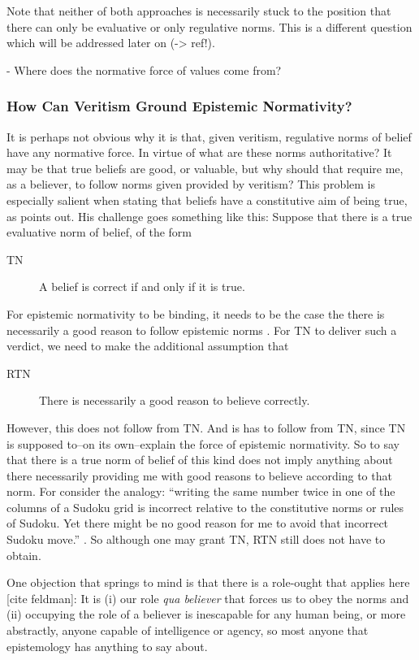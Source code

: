 \documentclass[12pt,numbers=noenddot]{scrartcl}
\begin{document}
Note that neither of both approaches is necessarily stuck to the position that there can only be evaluative or only regulative norms. This is a different question which will be addressed later on (-> ref!).

- Where does the normative force of values come from?
\subsubsection{How Can Veritism Ground Epistemic Normativity?}

It is perhaps not obvious why it is that, given veritism, regulative norms of belief have any normative force. In virtue of what are these norms authoritative? It may be that true beliefs are good, or valuable, but why should that require me, as a believer, to follow norms given provided by veritism? This problem is especially salient when stating that beliefs have a constitutive aim of being true, as \textcite{Cote-BouchardForthcoming-CTBCTA} points out. His challenge goes something like this: Suppose that there is a true evaluative norm of belief, of the form
\begin{description}
    \item[TN] A belief is correct if and only if it is true. \autocite{Wedgwood2002-WEDTAO}
\end{description}
For epistemic normativity to be binding, it needs to be the case the there is necessarily a good reason to follow epistemic norms \textcite[13]{Cote-BouchardForthcoming-CTBCTA}. For TN to deliver such a verdict, we need to make the additional assumption that
\begin{description}
    \item[RTN] There is necessarily a good reason to believe correctly.
\end{description}
However, this does not follow from TN. And is has to follow from TN, since TN is supposed to–on its own–explain the force of epistemic normativity. So to say that there is a true norm of belief of this kind does not imply anything about there necessarily providing me with good reasons to believe according to that norm. For consider the analogy: “writing the same number twice in one of the columns of a Sudoku grid is incorrect relative to the constitutive norms or rules of Sudoku. Yet there might be no good reason for me to avoid that incorrect Sudoku move.” \autocite[12]{Cote-BouchardForthcoming-CTBCTA}. So although one may grant TN, RTN still does not have to obtain.

One objection that springs to mind is that there is a role-ought that applies here [cite feldman]: It is (i) our role \emph{qua believer} that forces us to obey the norms and (ii) occupying the role of a believer is inescapable for any human being, or more abstractly, anyone capable of intelligence or agency, so most anyone that epistemology has anything to say about.
\end{document}
